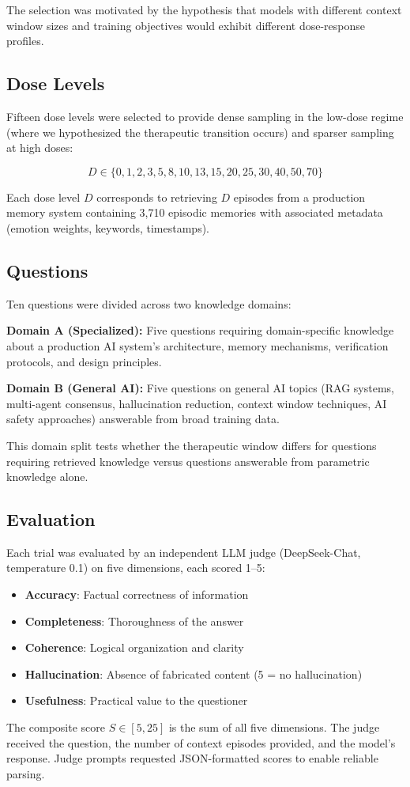 \documentclass[11pt,a4paper]{article}
\begin{document}
The selection was motivated by the hypothesis that models with different context window sizes and training objectives would exhibit different dose-response profiles.

\subsection{Dose Levels}
Fifteen dose levels were selected to provide dense sampling in the low-dose regime (where we hypothesized the therapeutic transition occurs) and sparser sampling at high doses:

\[
D \in \{0, 1, 2, 3, 5, 8, 10, 13, 15, 20, 25, 30, 40, 50, 70\}
\]

Each dose level $D$ corresponds to retrieving $D$ episodes from a production memory system containing 3,710 episodic memories with associated metadata (emotion weights, keywords, timestamps).

\subsection{Questions}
Ten questions were divided across two knowledge domains:

\textbf{Domain A (Specialized):} Five questions requiring domain-specific knowledge about a production AI system's architecture, memory mechanisms, verification protocols, and design principles.

\textbf{Domain B (General AI):} Five questions on general AI topics (RAG systems, multi-agent consensus, hallucination reduction, context window techniques, AI safety approaches) answerable from broad training data.

This domain split tests whether the therapeutic window differs for questions requiring retrieved knowledge versus questions answerable from parametric knowledge alone.

\subsection{Evaluation}
Each trial was evaluated by an independent LLM judge (DeepSeek-Chat, temperature 0.1) on five dimensions, each scored 1--5:
\begin{itemize}[itemsep=2pt]
  \item \textbf{Accuracy}: Factual correctness of information
  \item \textbf{Completeness}: Thoroughness of the answer
  \item \textbf{Coherence}: Logical organization and clarity
  \item \textbf{Hallucination}: Absence of fabricated content (5 = no hallucination)
  \item \textbf{Usefulness}: Practical value to the questioner
\end{itemize}
The composite score $S \in [5, 25]$ is the sum of all five dimensions. The judge received the question, the number of context episodes provided, and the model's response. Judge prompts requested JSON-formatted scores to enable reliable parsing.
\end{document}
